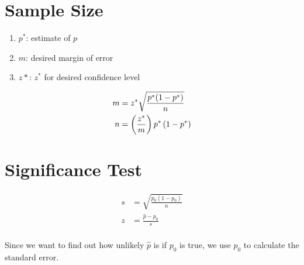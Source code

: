 \documentclass[letterpaper, landscape]{exam}
\begin{document}
  \section{Sample Size} %

  \begin{enumerate}[nosep, label={}]
    \item $p^*$: estimate of $p$
    \item $m$: desired margin of error
    \item $z*$: $z^*$ for desired confidence level
  \end{enumerate}

  \begin{align*}
    m &= z^* \sqrt{ \frac{p^* (1 - p^*)}{n} } \\
    n &= \del{ \frac{z^*}{m} } p^* \del{ 1 - p^* } \\
  \end{align*}
  
  \section{Significance Test} %

  \begin{align*}
    s & = \sqrt{ \frac{p_0 ( 1 - p_0 )}{n} } \\
    z & = \frac{ \hat{p} - p_0 }{ s }  \\
  \end{align*}
  
  Since we want to find out how unlikely $\hat{p}$ is if $p_0$ is true, we use
  $p_0$ to calculate the standard error.
\end{document}
